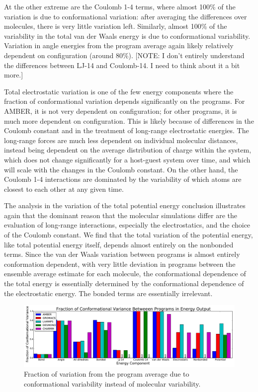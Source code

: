 At the other extreme are the Coulomb 1-4 terms, where almost 100\% of
the variation is due to conformational variation: after averaging the
differences over molecules, there is very little variation left.
Similarly, almost 100\% of the variability in the total van der Waals
energy is due to conformational variability.  Variation in angle
energies from the program average again likely relatively dependent on
configuration (around 80\%). [NOTE: I don't entirely understand the
  differences between LJ-14 and Coulomb-14.  I need to think about it
  a bit more.]

Total electrostatic variation is one of the few energy components
where the fraction of conformational variation depends significantly
on the programs.  For AMBER, it is not very dependent on
configuration; for other programs, it is much more dependent on
configuration. This is likely because of differences in the Coulomb
constant and in the treatment of long-range electrostatic
energies. The long-range forces are much less dependent on individual
molecular distances, instead being dependent on the average
distribution of charge within the system, which does not change
significantly for a host-guest system over time, and which will scale
with the changes in the Coulomb constant.  On the other hand, the
Coulomb 1-4 interactions are dominated by the variability of which
atoms are closest to each other at any given time.

The analysis in the variation of the total potential energy conclusion
illustrates again that the dominant reason that the molecular
simulations differ are the evaluation of long-range interactions,
especially the electrostatics, and the choice of the Coulomb
constant. We find that the total variation of the potential energy,
like total potential energy itself, depends almost entirely on the
nonbonded terms.  Since the van der Waals variation between programs
is almost entirely conformation dependent, with very little deviation
in programs between the ensemble average estimate for each molecule,
the conformational dependence of the total energy is essentially
determined by the conformational dependence of the electrostatic
energy. The bonded terms are essentially irrelevant.


\begin{figure}[h]
\includegraphics[width=\textwidth]{fractionofvariation.pdf}   
\caption{Fraction of variation from the program average due to
  conformational variability instead of molecular variability.
\label{fig:confvariability}}
\end{figure}

